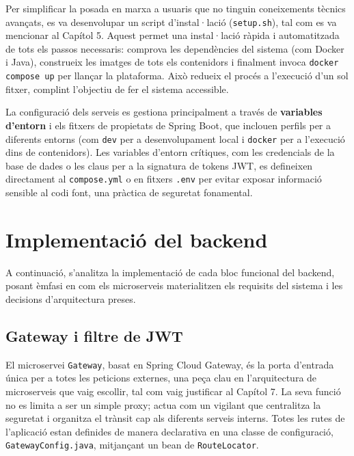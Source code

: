 Per simplificar la posada en marxa a usuaris que no tinguin coneixements tècnics avançats, es va desenvolupar un script d'instal·lació (\texttt{setup.sh}), tal com es va mencionar al Capítol 5. Aquest permet una instal·lació ràpida i automatitzada de tots els passos necessaris: comprova les dependències del sistema (com Docker i Java), construeix les imatges de tots els contenidors i finalment invoca \texttt{docker compose up} per llançar la plataforma. Això redueix el procés a l'execució d'un sol fitxer, complint l'objectiu de fer el sistema accessible.

La configuració dels serveis es gestiona principalment a través de \textbf{variables d'entorn} i els fitxers de propietats de Spring Boot, que inclouen perfils per a diferents entorns (com \texttt{dev} per a desenvolupament local i \texttt{docker} per a l'execució dins de contenidors). Les variables d'entorn crítiques, com les credencials de la base de dades o les claus per a la signatura de tokens JWT, es defineixen directament al \texttt{compose.yml} o en fitxers \texttt{.env} per evitar exposar informació sensible al codi font, una pràctica de seguretat fonamental.

\section{Implementació del backend}

A continuació, s'analitza la implementació de cada bloc funcional del backend, posant èmfasi en com els microserveis materialitzen els requisits del sistema i les decisions d'arquitectura preses.

\subsection{Gateway i filtre de JWT}

El microservei \texttt{Gateway}, basat en Spring Cloud Gateway, és la porta d'entrada única per a totes les peticions externes, una peça clau en l'arquitectura de microserveis que vaig escollir, tal com vaig justificar al Capítol 7. La seva funció no es limita a ser un simple proxy; actua com un vigilant que centralitza la seguretat i organitza el trànsit cap als diferents serveis interns. Totes les rutes de l'aplicació estan definides de manera declarativa en una classe de configuració, \texttt{GatewayConfig.java}, mitjançant un bean de \texttt{RouteLocator}.

